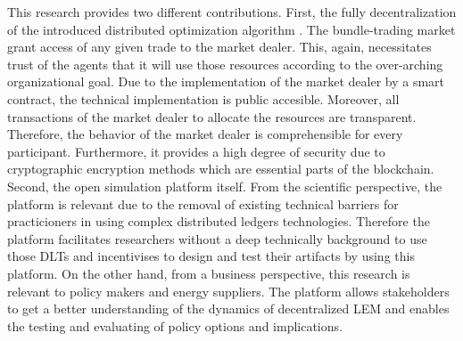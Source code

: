 This research provides two different contributions. First, the fully decentralization of the introduced distributed optimization algorithm \cite{guo2007market}. 
The bundle-trading market grant access of any given trade to the market dealer. This, again, necessitates trust of the agents that it will use those resources according to the over-arching organizational goal. Due to the implementation of the market dealer by a smart contract, the technical implementation is public accesible. Moreover, all transactions of the market dealer to allocate the resources are transparent. Therefore, the behavior of the market dealer is comprehensible for every participant. Furthermore, it provides a high degree of security due to cryptographic encryption methods which are essential parts of the blockchain.
Second, the open simulation platform itself. From the scientific perspective, the platform is relevant due to the removal of existing technical barriers for practicioners in using complex distributed ledgers technologies. Therefore the platform facilitates researchers without a deep technically background to use those DLTs and incentivises to design and test their artifacts by using this platform. 
On the other hand, from a business perspective, this research is relevant to policy makers and energy suppliers. The platform allows stakeholders to get a better understanding of the dynamics of decentralized LEM and enables the testing and evaluating of policy options and implications. 

  